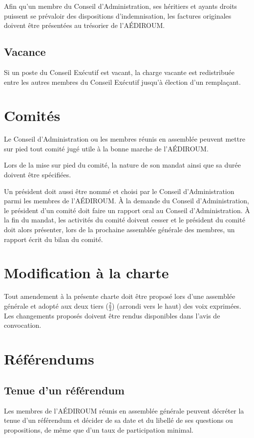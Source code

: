 \documentclass{aediroum}
\begin{document}
Afin qu'un membre du Conseil d'Administration, ses héritiers et ayants droits puissent se prévaloir des dispositions d'indemnisation, les factures originales doivent être présentées au trésorier de l'AÉDIROUM.

\subsection{Vacance}\label{sec:vacance}

Si un poste du Conseil Exécutif est vacant, la charge vacante est redistribuée entre les autres membres du Conseil Exécutif jusqu'à élection d'un remplaçant.

\section{Comités}\label{sec:comites}

Le Conseil d'Administration ou les membres réunis en assemblée peuvent mettre sur pied tout comité jugé utile à la bonne marche de l'AÉDIROUM.

Lors de la mise sur pied du comité, la nature de son mandat ainsi que sa durée doivent être spécifiées.

Un président doit aussi être nommé et choisi par le Conseil d'Administration parmi les membres de l'AÉDIROUM. À la demande du Conseil d'Administration, le président d'un comité doit faire un rapport oral au Conseil d'Administration. À la fin du mandat, les activités du comité doivent cesser et le président du comité doit alors présenter, lors de la prochaine assemblée générale des membres, un rapport écrit du bilan du comité.

\section{Modification à la charte}\label{sec:modification-a-la-charte}

Tout amendement à la présente charte doit être proposé lors d'une assemblée générale et adopté aux deux tiers (\( \frac{2}{3} \)) (arrondi vers le haut) des voix exprimées. Les changements proposés doivent être rendus disponibles dans l'avis de convocation.

\section{Référendums}\label{sec:referendums}
\subsection{Tenue d'un référendum}\label{sec:tenue-dun-referendum}
Les membres de l'AÉDIROUM réunis en assemblée générale peuvent décréter la tenue d'un référendum et décider de sa date et du libellé de ses questions ou propositions, de même que d'un taux de participation minimal.
\end{document}
